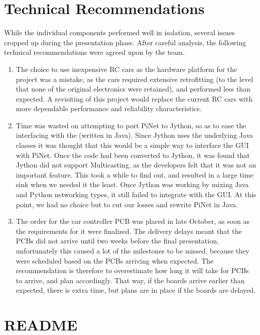 \documentclass[letterpaper,fleqn]{article}
\begin{document}
\section{Technical Recommendations}
While the individual components performed well in isolation, several issues cropped up during the presentation phase. After careful analysis, the following technical recommendations were agreed upon by the team.
\begin{enumerate}
\item The choice to use inexpensive RC cars as the hardware platform for the project was a mistake, as the cars required extensive retrofitting (to the level that none of the original electronics were retained), and performed less than expected. A revisiting of this project would replace the current RC cars with more dependable performance and reliability characteristics.


\item Time was wasted on attempting to port PiNet to Jython, so as to ease the interfacing with the 
(written in Java). Since Jython uses the underlying Java classes it was thought that this would be a simple way to interface the GUI with PiNet. 
Once the code had been converted to Jython, it was found that Jython did not support Multicasting, as the developers felt that it was not an important feature. This took a while to find out, and resulted in a large time sink when we needed it the least.
Once Jython was working by mixing Java and Python networking types, it still failed to integrate with the GUI. At this point, we had no choice but to cut our losses and rewrite PiNet in Java.

\item The order for the car controller PCB was placed in late October, as soon as the requirements for it were finalized. The delivery delays meant that the PCBs did not arrive until two weeks before the final presentation, unfortunately this caused a lot of the milestones to be missed, because they were scheduled based on the PCBs arriving when expected. The recommendation is therefore to overestimate how long it will take for PCBs to arrive, and plan accordingly. That way, if the boards arrive earlier than expected, there is extra time, but plans are in place if the boards are delayed.

\end{enumerate}
\section{README}
\end{document}
